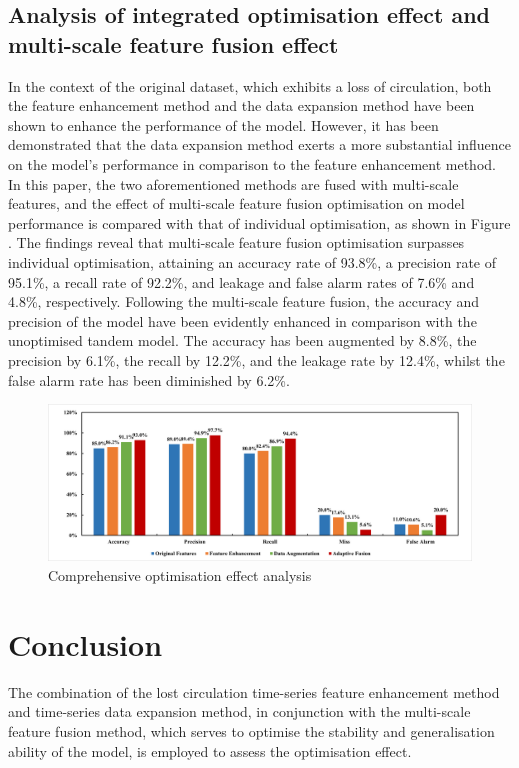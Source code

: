 \documentclass[journal,article,submit,pdftex,moreauthors]{Definitions/mdpi}
\begin{document}
\subsection{Analysis of integrated optimisation effect and multi-scale feature fusion effect}

In the context of the original dataset, which exhibits a loss of circulation, both the feature enhancement method and the data expansion method have been shown to enhance the performance of the model. However, it has been demonstrated that the data expansion method exerts a more substantial influence on the model's performance in comparison to the feature enhancement method. In this paper, the two aforementioned methods are fused with multi-scale features, and the effect of multi-scale feature fusion optimisation on model performance is compared with that of individual optimisation, as shown in Figure \label{fig:Comprehensive optimisation effect analysis}. The findings reveal that multi-scale feature fusion optimisation surpasses individual optimisation, attaining an accuracy rate of 93.8\%, a precision rate of 95.1\%, a recall rate of 92.2\%, and leakage and false alarm rates of 7.6\% and 4.8\%, respectively. Following the multi-scale feature fusion, the accuracy and precision of the model have been evidently enhanced in comparison with the unoptimised tandem model. The accuracy has been augmented by 8.8\%, the precision by 6.1\%, the recall by 12.2\%, and the leakage rate by 12.4\%, whilst the false alarm rate has been diminished by 6.2\%.

\begin{figure}[h]
    \centering
    \includegraphics[width=1\linewidth]{图片/综合图像.png}
    \caption{Comprehensive optimisation effect analysis}
    \label{fig:Comprehensive optimisation effect analysis}
\end{figure}
\section{Conclusion}
The combination of the lost circulation time-series feature enhancement method and time-series data expansion method, in conjunction with the multi-scale feature fusion method, which serves to optimise the stability and generalisation ability of the model, is employed to assess the optimisation effect.
\end{document}
